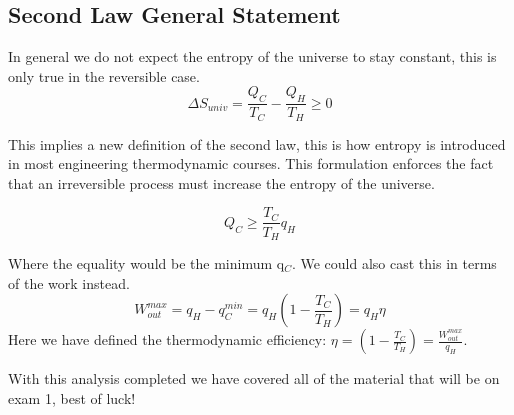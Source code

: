 \documentclass{article}
\begin{document}
\subsection*{Second Law General Statement}
In general we do not expect the entropy of the universe to stay constant, this is only true in the reversible case. 
\begin{equation}
\Delta S_{univ} = \frac{Q_C}{T_C} - \frac{Q_H}{T_H} \geq 0
\end{equation}

This implies a new definition of the second law, this is how entropy is introduced in most engineering thermodynamic courses.
This formulation enforces the fact that an irreversible process must increase the entropy of the universe. 

\begin{equation}
Q_C \geq \frac{T_C}{T_H}q_H
\end{equation}

Where the equality would be the minimum q$_C$. 
We could also cast this in terms of the work instead. 
\begin{equation}
W_{out}^{max} = q_H - q_C^{min} = q_H\left(1-\frac{T_C}{T_H}\right) = q_H\eta
\end{equation}
Here we have defined the thermodynamic efficiency: $\eta = \left(1-\frac{T_C}{T_H}\right) = \frac{W_{out}^{max}}{q_H}$. 

With this analysis completed we have covered all of the material that will be on exam 1, best of luck!
\end{document}
